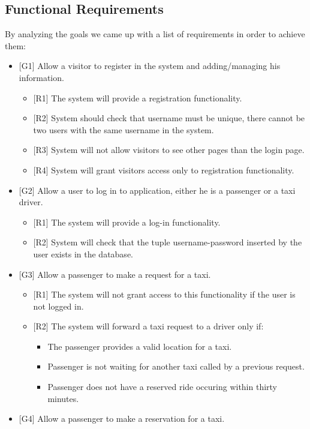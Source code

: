 \documentclass[a4paper, 12pt, titlepage]{article}
\begin{document}
\subsection{Functional Requirements}
By analyzing the goals we came up with a list of requirements in order to achieve them:
	\begin{itemize}
		\item {[G1]} Allow a visitor to register in the system and adding/managing his information.
			\begin{itemize}
				\item {[R1]} The system will provide a registration functionality.
				\item {[R2]} System should check that username must be unique, there cannot be two users with the same username in the system.
				\item {[R3]} System will not allow visitors to see other pages than the login page.
				\item {[R4]} System will grant visitors access only to registration functionality.
			\end{itemize}
		\item {[G2]} Allow a user to log in to application, either he is a passenger or a taxi driver.
			\begin{itemize}
				\item {[R1]} The system will provide a log-in functionality.
				\item {[R2]} System will check that the tuple username-password inserted by the user exists in the database.
			\end{itemize}
		\item {[G3]} Allow a passenger to make a request for a taxi.
	\begin{itemize}
		\item {[R1]} The system will not grant access to this functionality if the user is not logged in.
		\item {[R2]} The system will forward a taxi request to a driver only if:
		\begin{itemize}
			\item The passenger provides a valid location for a taxi.
			\item Passenger is not waiting for another taxi called by a previous request.
			\item Passenger does not have a reserved ride occuring within thirty minutes.
		\end{itemize}
	\end{itemize}
		\item {[G4]} Allow a passenger to make a reservation for a taxi.

\end{itemize}
\end{document}
